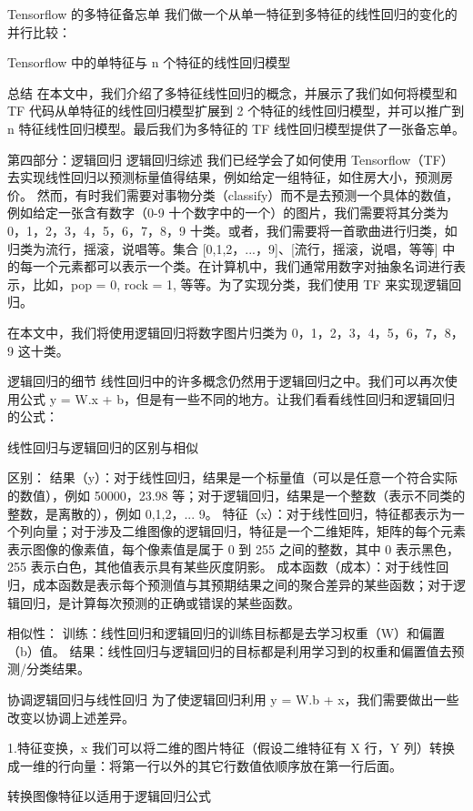 \documentclass[11pt]{book} %
\begin{document}
Tensorflow 的多特征备忘单
我们做一个从单一特征到多特征的线性回归的变化的并行比较：

Tensorflow 中的单特征与 n 个特征的线性回归模型 

总结
在本文中，我们介绍了多特征线性回归的概念，并展示了我们如何将模型和 TF 代码从单特征的线性回归模型扩展到 2 个特征的线性回归模型，并可以推广到 n 特征线性回归模型。最后我们为多特征的 TF 线性回归模型提供了一张备忘单。

第四部分：逻辑回归
逻辑回归综述
我们已经学会了如何使用 Tensorflow（TF）去实现线性回归以预测标量值得结果，例如给定一组特征，如住房大小，预测房价。
然而，有时我们需要对事物分类（classify）而不是去预测一个具体的数值，例如给定一张含有数字（0-9 十个数字中的一个）的图片，我们需要将其分类为 0，1，2，3，4，5，6，7，8，9 十类。或者，我们需要将一首歌曲进行归类，如归类为流行，摇滚，说唱等。集合 [0,1,2，...，9]、[流行，摇滚，说唱，等等] 中的每一个元素都可以表示一个类。在计算机中，我们通常用数字对抽象名词进行表示，比如，pop = 0, rock = 1, 等等。为了实现分类，我们使用 TF 来实现逻辑回归。

在本文中，我们将使用逻辑回归将数字图片归类为 0，1，2，3，4，5，6，7，8，9 这十类。

逻辑回归的细节
线性回归中的许多概念仍然用于逻辑回归之中。我们可以再次使用公式 y = W.x + b，但是有一些不同的地方。让我们看看线性回归和逻辑回归的公式：


线性回归与逻辑回归的区别与相似 

区别：
结果（y）：对于线性回归，结果是一个标量值（可以是任意一个符合实际的数值），例如 50000，23.98 等；对于逻辑回归，结果是一个整数（表示不同类的整数，是离散的），例如 0,1,2，... 9。
特征（x）：对于线性回归，特征都表示为一个列向量；对于涉及二维图像的逻辑回归，特征是一个二维矩阵，矩阵的每个元素表示图像的像素值，每个像素值是属于 0 到 255 之间的整数，其中 0 表示黑色，255 表示白色，其他值表示具有某些灰度阴影。
成本函数（成本）：对于线性回归，成本函数是表示每个预测值与其预期结果之间的聚合差异的某些函数；对于逻辑回归，是计算每次预测的正确或错误的某些函数。

相似性：
训练：线性回归和逻辑回归的训练目标都是去学习权重（W）和偏置（b）值。
结果：线性回归与逻辑回归的目标都是利用学习到的权重和偏置值去预测/分类结果。

协调逻辑回归与线性回归
为了使逻辑回归利用 y = W.b + x，我们需要做出一些改变以协调上述差异。

1.特征变换，x
我们可以将二维的图片特征（假设二维特征有 X 行，Y 列）转换成一维的行向量：将第一行以外的其它行数值依顺序放在第一行后面。

转换图像特征以适用于逻辑回归公式 
\end{document}
